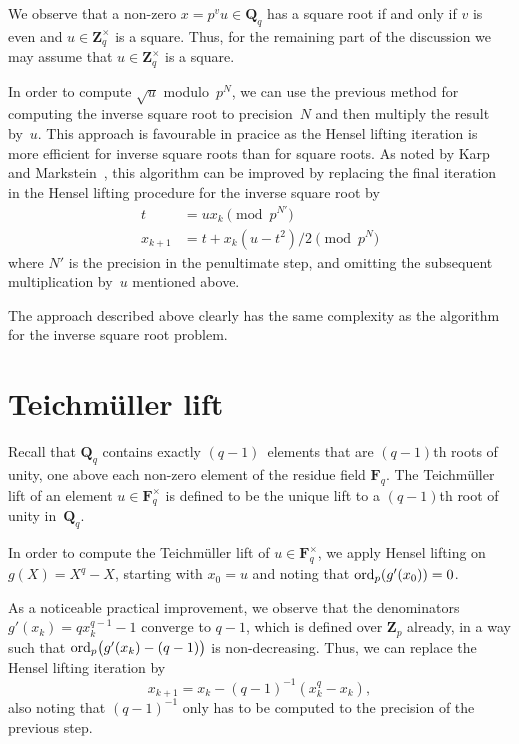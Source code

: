 We observe that a non-zero $x = p^v u \in \mathbf{Q}_q$ has a square 
root if and only if $v$ is even and $u \in \mathbf{Z}_q^{\times}$ is 
a square.  Thus, for the remaining part of the discussion we may 
assume that $u \in \mathbf{Z}_q^{\times}$ is a square.

In order to compute $\sqrt{u}$ modulo~$p^N$, we can use the previous method 
for computing the inverse square root to precision~$N$ and then multiply 
the result by~$u$.  This approach is favourable in pracice as the Hensel 
lifting iteration is more efficient for inverse square roots than for 
square roots.
As noted by Karp and Markstein~\citep{KarpMarkstein1997}, this algorithm 
can be improved by replacing the final iteration in the Hensel lifting 
procedure for the inverse square root by 
\begin{align}
t       & = u x_k \pmod{p^{N'}} \\
x_{k+1} & = t + x_k (u - t^2) / 2 \pmod{p^N}
\end{align}
where $N'$ is the precision in the penultimate step, and omitting the 
subsequent multiplication by~$u$ mentioned above.

The approach described above clearly has the same complexity as the 
algorithm for the inverse square root problem. 

\section{Teichm\"uller lift}

Recall that $\mathbf{Q}_q$ contains exactly $(q-1)$~elements that are 
$(q-1)$th roots of unity, one above each non-zero element of the residue 
field $\mathbf{F}_q$.  The Teichm\"uller lift of an element 
$u \in \mathbf{F}_q^{\times}$ is defined to be the unique lift to a 
$(q-1)$th root of unity 
in~$\mathbf{Q}_q$.

In order to compute the Teichm\"uller lift of $u \in \mathbf{F}_q^{\times}$, 
we apply Hensel lifting on $g(X) = X^q - X$, starting with $x_0 = u$ and 
noting that $\operatorname{ord}_p(g'(x_0)) = 0$. 

As a noticeable practical improvement, we observe that the denominators 
$g'(x_k) = q x_k^{q-1} - 1$ converge to $q-1$, which is defined over 
$\mathbf{Z}_p$ already, in a way such that $\operatorname{ord}_p\bigl(g'(x_k) - (q-1)\bigr)$ 
is non-decreasing.  Thus, we can replace the Hensel lifting iteration by 
\begin{equation}
x_{k+1} = x_k - (q-1)^{-1} (x_k^q - x_k), 
\end{equation}
also noting that $(q-1)^{-1}$ only has to be computed to the precision 
of the previous step.

